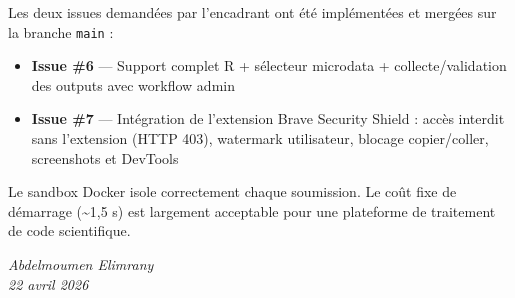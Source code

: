 \documentclass[12pt,a4paper]{article}
\begin{document}
Les deux issues demandées par l'encadrant ont été implémentées et mergées sur la branche \texttt{main} :

\begin{itemize}
  \item \textbf{Issue \#6} — Support complet R + sélecteur microdata + collecte/validation des outputs avec workflow admin
  \item \textbf{Issue \#7} — Intégration de l'extension Brave Security Shield : accès interdit sans l'extension (HTTP 403), watermark utilisateur, blocage copier/coller, screenshots et DevTools
\end{itemize}

Le sandbox Docker isole correctement chaque soumission. Le coût fixe de démarrage (\textasciitilde 1,5 s) est largement acceptable pour une plateforme de traitement de code scientifique.

\vspace{1cm}
\begin{flushright}
\textit{Abdelmoumen Elimrany} \\
\textit{22 avril 2026}
\end{flushright}
\end{document}

